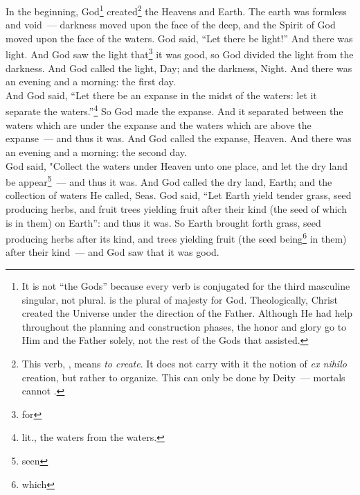 
\begin{enumerate*}[mode=unboxed]
     In the beginning, God\footnote{It is not ``the Gods'' because every verb is conjugated for the third masculine singular, not plural.  is the plural of majesty for God. Theologically, Christ created the Universe under the direction of the Father. Although He had help throughout the planning and construction phases, the honor and glory go to Him and the Father solely, not the rest of the Gods that assisted.} created\footnote{This verb, , means \textit{to create}. It does not carry with it the notion of \textit{ex nihilo} creation, but rather to organize. This can only be done by Deity~--- mortals cannot .} the Heavens and Earth.%
     The earth was formless and void~--- darkness moved upon the face of the deep, and the Spirit of God moved upon the face of the waters.%
     God said, ``Let there be light!'' And there was light.%
     And God saw the light that\footnote{for} it was good, so God divided the light from the darkness.%
     And God called the light, Day; and the darkness, Night. And there was an evening and a morning: the first day.\\%
     And God said, ``Let there be an expanse in the midst of the waters: let it separate the waters.''\footnote{lit., the waters from the waters.}%
     So God made the expanse. And it separated between the waters which are under the expanse and the waters which are above the expanse~--- and thus it was.%
     And God called the expanse, Heaven. And there was an evening and a morning: the second day.\\%
     God said, "Collect the waters under Heaven unto one place, and let the dry land be appear\footnote{seen}~--- and thus it was.%
     And God called the dry land, Earth; and the collection of waters He called, Seas.%
     God said, ``Let Earth yield tender grass, seed producing herbs, and fruit trees yielding fruit after their kind (the seed of which is in them) on Earth'': and thus it was.%
     So Earth brought forth grass, seed producing herbs after its kind, and trees yielding fruit (the seed being\footnote{which} in them) after their kind~--- and God saw that it was good.%

\end{enumerate*}
